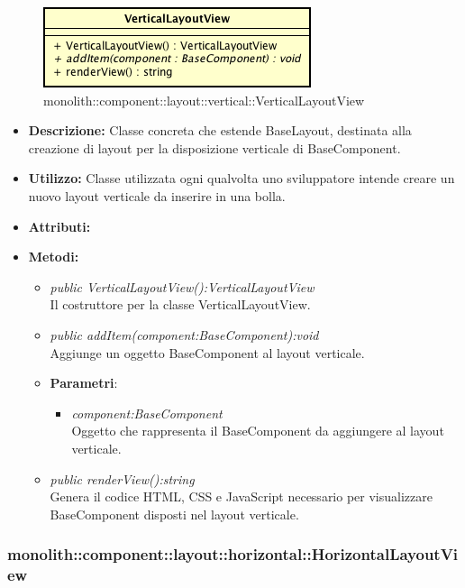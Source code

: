 \label{monolith::component::layout::vertical::VerticalLayoutView}
\begin{figure}[ht]
	\centering
	\includegraphics[scale=0.5]{Sezioni/SottosezioniST/img/VerticalLayoutView.png}
	\caption{monolith::component::layout::vertical::VerticalLayoutView}
\end{figure}

\begin{itemize}
\item \textbf{Descrizione:} Classe concreta che estende BaseLayout, destinata alla creazione di layout per la disposizione verticale di BaseComponent.
\item \textbf{Utilizzo:} Classe utilizzata ogni qualvolta uno sviluppatore intende creare un nuovo layout verticale da inserire in una bolla.
\item \textbf{Attributi:}
\item \textbf{Metodi:}
\begin{itemize}
\item\textit{public VerticalLayoutView():VerticalLayoutView}\\
Il costruttore per la classe VerticalLayoutView.
\item \textit{public addItem(component:BaseComponent):void}\\
Aggiunge un oggetto BaseComponent al layout verticale.
\item{\textbf{Parametri}: \begin{itemize}
\item \textit{component:BaseComponent}\\
Oggetto che rappresenta il BaseComponent da aggiungere al layout verticale.
\end{itemize}}
\item \textit{public renderView():string}\\
Genera il codice HTML, CSS e JavaScript necessario per visualizzare BaseComponent disposti nel layout verticale.
\end{itemize}
\end{itemize}

\subsubsection{monolith::component::layout::horizontal::HorizontalLayoutView}

